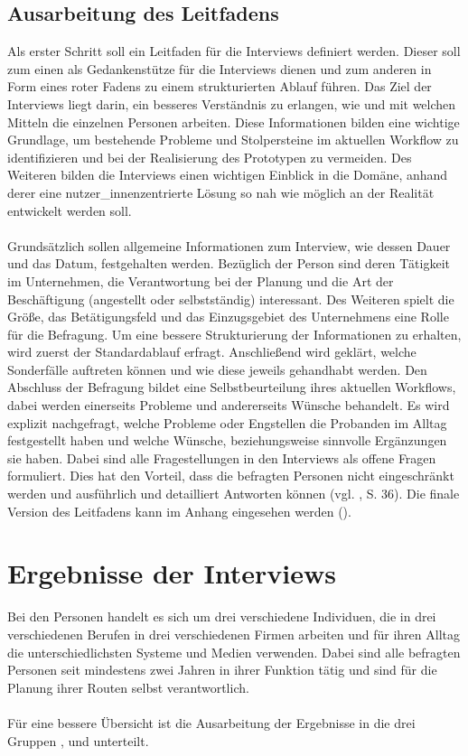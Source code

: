 \documentclass[Bachelorarbeit.tex]{subfiles}
\begin{document}
\subsection{Ausarbeitung des Leitfadens}

Als erster Schritt soll ein Leitfaden für die Interviews definiert werden. 
Dieser soll zum einen als Gedankenstütze für die Interviews dienen und zum anderen in Form eines roter Fadens zu einem strukturierten Ablauf führen.
Das Ziel der Interviews liegt darin, ein besseres Verständnis zu erlangen, wie und mit welchen Mitteln die einzelnen Personen arbeiten.
Diese Informationen bilden eine wichtige Grundlage, um bestehende Probleme und Stolpersteine im aktuellen Workflow zu identifizieren und bei der Realisierung des Prototypen zu vermeiden. 
Des Weiteren bilden die Interviews einen wichtigen Einblick in die Domäne, anhand derer eine nutzer\_innenzentrierte Lösung so nah wie möglich an der Realität entwickelt werden soll.\\
\\
Grundsätzlich sollen allgemeine Informationen zum Interview, wie dessen Dauer und das Datum, festgehalten werden.
Bezüglich der Person sind deren Tätigkeit im Unternehmen, die Verantwortung bei der Planung und die Art der Beschäftigung (angestellt oder selbstständig) interessant.
Des Weiteren spielt die Größe, das Betätigungsfeld und das Einzugsgebiet des Unternehmens eine Rolle für die Befragung.
Um eine bessere Strukturierung der Informationen zu erhalten, wird zuerst der Standardablauf erfragt. 
Anschließend wird geklärt, welche Sonderfälle auftreten können und wie diese jeweils gehandhabt werden.
Den Abschluss der Befragung bildet eine Selbstbeurteilung ihres aktuellen Workflows, dabei werden einerseits Probleme und andererseits Wünsche behandelt.
Es wird explizit nachgefragt, welche Probleme oder Engstellen die Probanden im Alltag festgestellt haben und welche Wünsche, beziehungsweise sinnvolle Ergänzungen sie haben. 
Dabei sind alle Fragestellungen in den Interviews als offene Fragen formuliert. 
Dies hat den Vorteil, dass die befragten Personen nicht eingeschränkt werden und ausführlich und detailliert Antworten können (vgl. \cite{Mayer2006}, S. 36).
Die finale Version des Leitfadens kann im Anhang eingesehen werden (). 


\section{Ergebnisse der Interviews}
Bei den Personen handelt es sich um drei verschiedene Individuen, die in drei verschiedenen Berufen in drei verschiedenen Firmen arbeiten und für ihren Alltag die unterschiedlichsten Systeme und Medien verwenden. 
Dabei sind alle befragten Personen seit mindestens zwei Jahren in ihrer Funktion tätig und sind für die Planung ihrer Routen selbst verantwortlich.
\\
\\
Für eine bessere Übersicht ist die Ausarbeitung der Ergebnisse in die drei Gruppen
,  und  unterteilt. 
\end{document}

